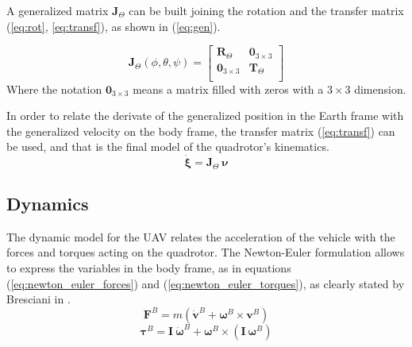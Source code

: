 \documentclass[journal]{IEEEtran}
\begin{document}
	A generalized matrix $\bm{J}_\Theta$ can be built joining the rotation and the transfer matrix (\ref{eq:rot}, \ref{eq:transf}), as shown in (\ref{eq:gen}).
	
	\begin{equation} \label{eq:gen}
	\bm{J}_\Theta (\phi,\theta, \psi)= \left[ {\begin{array}{cc}
		\bm{R}_\Theta &  \mathbf{0}_{3\times 3} \\
		\mathbf{0}_{3\times 3} & \bm{T}_\Theta \\
		\end{array} } \right]
	\end{equation}  
	Where the notation $\mathbf{0}_{3\times 3}$ means a matrix filled with zeros with a $3 \times 3$ dimension.
	
	In order to relate the derivate of the generalized position in the Earth frame with the generalized velocity on the body frame, the transfer matrix (\ref{eq:transf}) can be used, and that is the final model of the quadrotor's kinematics.
	\begin{equation} \label{eq:derivpos_earth_body}
	\bm{\dot \xi} %
	= \bm{J}_\Theta \ \bm{\nu}
	\end{equation}
	
	\subsection{Dynamics}
	The dynamic model for the UAV relates the acceleration of the vehicle with the forces and torques acting on the quadrotor. The Newton-Euler formulation allows to express the variables in the body frame, as in equations (\ref{eq:newton_euler_forces}) and (\ref{eq:newton_euler_torques}), as clearly stated by Bresciani in \cite{mod_control_bresciani}.
	\begin{equation} \label{eq:newton_euler_forces}
	\bm{F}^B = m ( \bm{\dot v}^B + \bm{\omega}^B \times \bm{v}^B)
	\end{equation}
	\begin{equation} \label{eq:newton_euler_torques}
	\bm{\tau}^B = \bm{I} \ \bm{\dot \omega}^B + \bm{\omega}^B \times (\bm{I} \ \bm{\omega}^B)
	\end{equation}
	
\end{document}
